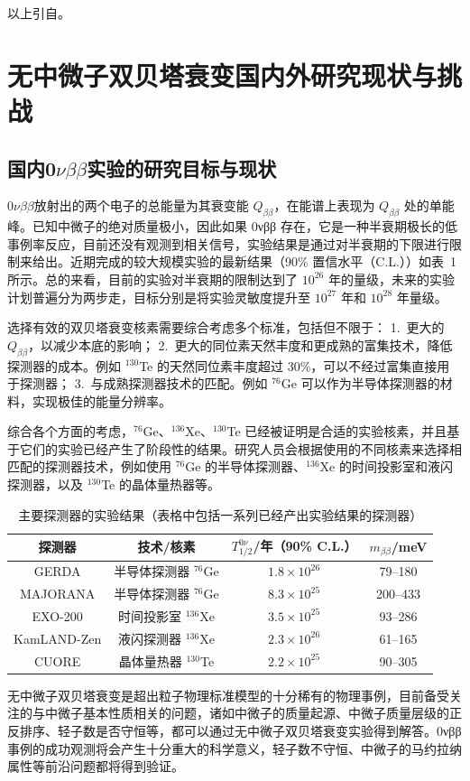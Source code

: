 \documentclass[type=master]{fduthesis}
\begin{document}
{\color{red} 以上引自}\cite{Wang2025}。




\section{无中微子双贝塔衰变国内外研究现状与挑战}
\subsection{国内0$\nu\beta\beta$实验的研究目标与现状}
0$\nu\beta\beta$放射出的两个电子的总能量为其衰变能 $Q_{\beta\beta}$，在能谱上表现为 $Q_{\beta\beta}$ 处的单能峰。已知中微子的绝对质量极小，因此如果 0νββ 存在，它是一种半衰期极长的低事例率反应，目前还没有观测到相关信号，实验结果是通过对半衰期的下限进行限制来给出。近期完成的较大规模实验的最新结果（90\% 置信水平（C.L.））如表~1 所示\cite{Agostini2020,Arnquist2023,Anton2019,Abe2023,CUORE2022}。总的来看，目前的实验对半衰期的限制达到了 $10^{26}$ 年的量级，未来的实验计划普遍分为两步走，目标分别是将实验灵敏度提升至 $10^{27}$ 年和 $10^{28}$ 年量级。

选择有效的双贝塔衰变核素需要综合考虑多个标准，包括但不限于：
1.~更大的 $Q_{\beta\beta}$，以减少本底的影响；
2.~更大的同位素天然丰度和更成熟的富集技术，降低探测器的成本。例如 $^{130}$Te 的天然同位素丰度超过 30\%，可以不经过富集直接用于探测器；
3.~与成熟探测器技术的匹配。例如 $^{76}$Ge 可以作为半导体探测器的材料，实现极佳的能量分辨率。

综合各个方面的考虑，$^{76}$Ge、$^{136}$Xe、$^{130}$Te 已经被证明是合适的实验核素，并且基于它们的实验已经产生了阶段性的结果。研究人员会根据使用的不同核素来选择相匹配的探测器技术，例如使用 $^{76}$Ge 的半导体探测器、$^{136}$Xe 的时间投影室和液闪探测器，以及 $^{130}$Te 的晶体量热器等。
\begin{table}[htbp]
\centering
\caption{主要探测器的实验结果（表格中包括一系列已经产出实验结果的探测器）}
\begin{tabular}{cccc}
\hline
探测器 & 技术/核素 & $T^{0\nu}_{1/2}$/年（90\% C.L.） & $m_{\beta\beta}$/meV \\
\hline
GERDA & 半导体探测器 $^{76}$Ge & $1.8\times 10^{26}$\cite{Agostini2020} & 79--180 \\
MAJORANA & 半导体探测器 $^{76}$Ge & $8.3\times 10^{25}$\cite{Arnquist2023} & 200--433 \\
EXO-200 & 时间投影室 $^{136}$Xe & $3.5\times 10^{25}$\cite{Anton2019} & 93--286 \\
KamLAND-Zen & 液闪探测器 $^{136}$Xe & $2.3\times 10^{26}$\cite{Abe2023} & 61--165 \\
CUORE & 晶体量热器 $^{130}$Te & $2.2\times 10^{25}$\cite{CUORE2022} & 90--305 \\
\hline
\end{tabular}
\end{table}
无中微子双贝塔衰变是超出粒子物理标准模型的十分稀有的物理事例，目前备受关注的与中微子基本性质相关的问题，诸如中微子的质量起源、中微子质量层级的正反排序、轻子数是否守恒等，都可以通过无中微子双贝塔衰变实验得到解答。0νββ 事例的成功观测将会产生十分重大的科学意义，轻子数不守恒、中微子的马约拉纳属性等前沿问题都将得到验证。
\end{document}
